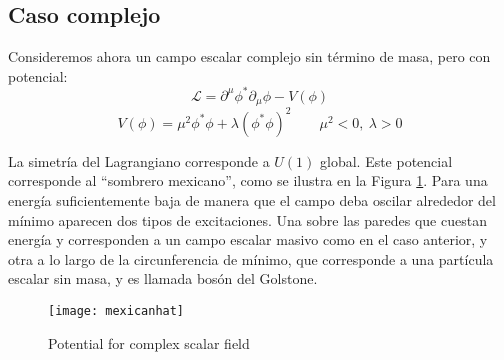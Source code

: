 \subsection{Caso complejo}

\begin{frame}
Consideremos ahora un campo escalar complejo sin término de masa, pero con potencial:
\begin{equation}
  \label{eq:85qft}
  \mathcal{L}=\partial^\mu\phi^*\partial_\mu\phi-V(\phi)
\end{equation}
\begin{equation}
  V(\phi)=\mu^2\phi^*\phi+\lambda(\phi^*\phi)^2 
  \qquad 
  \mu^2\lt 0,\ \lambda\gt 0 
\end{equation}
\end{frame}
La simetría del Lagrangiano corresponde a $U(1)$ global. Este potencial corresponde al ``sombrero mexicano'', como se ilustra en la Figura \ref{fig:mexicanhat}. Para una energía suficientemente baja de manera que el campo deba oscilar alrededor del mínimo aparecen dos tipos de excitaciones. Una sobre las paredes  que cuestan energía y corresponden a un campo escalar masivo como en el caso anterior, y otra a lo largo de la circunferencia de mínimo, que corresponde a una partícula escalar sin masa, y es llamada bosón del Golstone. 

\begin{frame}



\begin{figure}
  \centering
  \texttt{[image: mexicanhat]}
  \caption{Potential for complex scalar field}
  \label{fig:mexicanhat}
\end{figure}

\end{frame}

